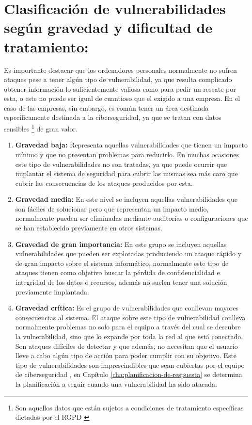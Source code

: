 \section{Clasificación de vulnerabilidades según gravedad y dificultad de tratamiento:}

Es importante destacar que los ordenadores personales normalmente no sufren ataques pese a tener algún tipo de vulnerabilidad, ya que resulta complicado obtener información lo suficientemente valiosa como para pedir un rescate por esta, o este no puede ser igual de cuantioso que el exigido a una empresa.
En el caso de las empresas, sin embargo, es común tener un área destinada específicamente destinada a la ciberseguridad, ya que se tratan con datos sensibles \footnote{Son aquellos datos que están sujetos a condiciones de tratamiento específicas dictadas por el RGPD \cite{comision_europea}} de gran valor. 

\begin{enumerate}
\item {\bfseries Gravedad baja: }
Representa aquellas vulnerabilidades que tienen un impacto mínimo y que no presentan problemas para reducirlo. En muchas ocasiones este tipo de vulnerabilidades no son tratadas, ya que puede ocurrir que implantar el sistema de seguridad para cubrir las mismas sea más caro que cubrir las consecuencias de los ataques producidos por esta.
\item {\bfseries Gravedad media: }
En este nivel se incluyen aquellas vulnerabilidades que son fáciles de solucionar pero que representan un impacto medio, normalmente pueden ser eliminadas mediante auditorías o configuraciones que se han establecido previamente en otros sistemas.
\item {\bfseries Gravedad de gran importancia:}
En este grupo se incluyen aquellas vulnerabilidades que pueden ser explotadas produciendo un ataque rápido y de gran impacto sobre el sistema informático, normalmente este tipo de ataques tienen como objetivo buscar la pérdida de confidencialidad e integridad de los datos o recursos, además no suelen tener una solución previamente implantada.
\item {\bfseries Gravedad crítica: }
Es el grupo de vulnerabilidades que conllevan mayores consecuencias al sistema. El ataque sobre este tipo de vulnerabilidad conlleva normalmente problemas no solo para el equipo a través del cual se descubre la vulnerabilidad, sino que lo expande por toda la red al que está conectado. Son ataques difíciles de detectar y que además, no necesitan que el usuario lleve a cabo algún tipo de acción para poder cumplir con su objetivo.
Este tipo de vulnerabilidades son imprescindibles que sean cubiertas por el equipo de ciberseguridad , en Capítulo \ref{cha:planificacion-de-respuesta} se determina la planificación a seguir cuando una vulnerabilidad ha sido atacada.
\end{enumerate}


